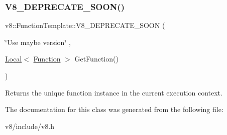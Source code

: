 \subsubsection{\texorpdfstring{V8\+\_\+\+D\+E\+P\+R\+E\+C\+A\+T\+E\+\_\+\+S\+O\+O\+N()}{V8\_DEPRECATE\_SOON()}}
{\footnotesize\ttfamily v8\+::\+Function\+Template\+::\+V8\+\_\+\+D\+E\+P\+R\+E\+C\+A\+T\+E\+\_\+\+S\+O\+ON (\begin{DoxyParamCaption}\item[{\char`\"{}Use maybe version\char`\"{}}]{,  }\item[{\mbox{\hyperlink{classv8_1_1Local}{Local}}$<$ \mbox{\hyperlink{classv8_1_1Function}{Function}} $>$ }]{Get\+Function() }\end{DoxyParamCaption})}

Returns the unique function instance in the current execution context. 

The documentation for this class was generated from the following file\+:\begin{DoxyCompactItemize}
\item 
v8/include/v8.\+h\end{DoxyCompactItemize}
